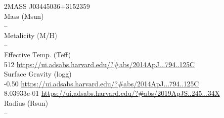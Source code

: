 2MASS J03445036+3152359\\
Mass (Msun)\\
--\\
Metalicity (M/H)\\
--\\
Effective Temp. (Teff)\\
512 \url{https://ui.adsabs.harvard.edu/?#abs/2014ApJ...794..125C}\\
Surface Gravity (logg)\\
-0.50 \url{https://ui.adsabs.harvard.edu/?#abs/2014ApJ...794..125C}\\
8.03933e-01 \url{https://ui.adsabs.harvard.edu/?#abs/2019ApJS..245...34X}\\
Radius (Rsun)\\
--\\